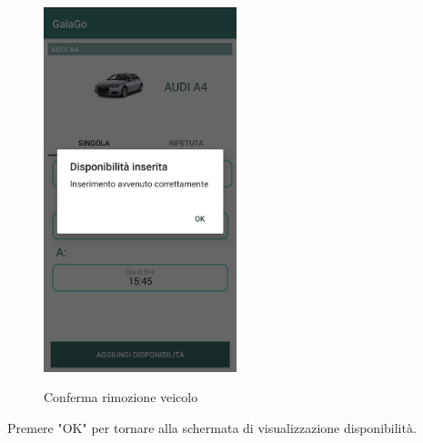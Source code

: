 \begin{figure}[H] 
	\centering 
	\includegraphics[width=0.5\textwidth]{res/images/conferma_disponibilita.png}\\
	\caption{Conferma rimozione veicolo}
	\label{conferma}
\end{figure}
Premere "OK" per tornare alla schermata di visualizzazione disponibilità. 
\pagebreak

